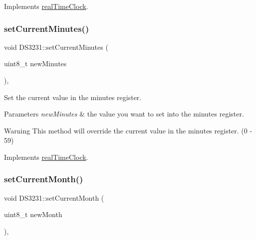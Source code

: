 Implements \mbox{\hyperlink{classreal_time_clock_a515d9de6067ae563bff5217da5100a23}{real\+Time\+Clock}}.

\mbox{\label{class_d_s3231_a221f92091b813108b3515f6676be29c8}} 
\subsubsection{\texorpdfstring{set\+Current\+Minutes()}{setCurrentMinutes()}}
{\footnotesize\ttfamily void D\+S3231\+::set\+Current\+Minutes (\begin{DoxyParamCaption}\item[{uint8\+\_\+t}]{new\+Minutes }\end{DoxyParamCaption})\hspace{0.3cm}{\ttfamily [override]}, {\ttfamily [virtual]}}



Set the current value in the minutes register. 


\begin{DoxyParams}{Parameters}
{\em new\+Minutes} & the value you want to set into the minutes register. \\
\hline
\end{DoxyParams}
\begin{DoxyWarning}{Warning}
This method will override the current value in the minutes register. (0 -\/ 59) 
\end{DoxyWarning}


Implements \mbox{\hyperlink{classreal_time_clock_a52da7366cd5f1e4c270eb87e7298da42}{real\+Time\+Clock}}.

\mbox{\label{class_d_s3231_a122611bf693cdd538178b99b893a7115}} 
\subsubsection{\texorpdfstring{set\+Current\+Month()}{setCurrentMonth()}}
{\footnotesize\ttfamily void D\+S3231\+::set\+Current\+Month (\begin{DoxyParamCaption}\item[{uint8\+\_\+t}]{new\+Month }\end{DoxyParamCaption})\hspace{0.3cm}{\ttfamily [override]}, {\ttfamily [virtual]}}




